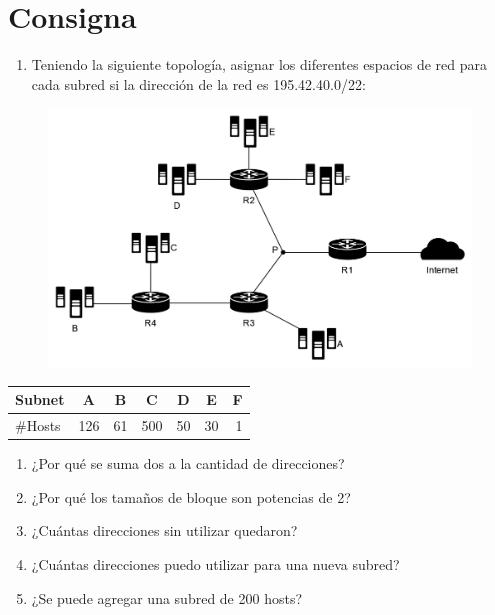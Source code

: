 \section*{Consigna}

\begin{enumerate}[left=0cm]
    \item Teniendo la siguiente topología, asignar los diferentes espacios de red para cada subred si la dirección de la red es 195.42.40.0/22:
\end{enumerate}

\vspace{-\baselineskip}
\begin{figure}[H]
    \centering
    \includegraphics[width=1\linewidth]{Images/topologia.png}
\end{figure}

\vspace{-\baselineskip}
\begin{table}[H]
    \centering
    \begin{tabular}{|l|c|c|c|c|c|c|}
    \hline
    \multicolumn{1}{|c|}{Subnet} & A & B & C & D & E & F \\ \hline
    \#Hosts & \multicolumn{1}{r|}{126} & \multicolumn{1}{r|}{61} & \multicolumn{1}{r|}{500} & \multicolumn{1}{r|}{50} & \multicolumn{1}{r|}{30} & \multicolumn{1}{r|}{1} \\ \hline
    \end{tabular}
\end{table}

\begin{enumerate}[start=2, left=0cm]
    \item ¿Por qué se suma dos a la cantidad de direcciones?
    \item ¿Por qué los tamaños de bloque son potencias de 2?
    \item ¿Cuántas direcciones sin utilizar quedaron?
    \item ¿Cuántas direcciones puedo utilizar para una nueva subred?
    \item ¿Se puede agregar una subred de 200 hosts?
\end{enumerate}